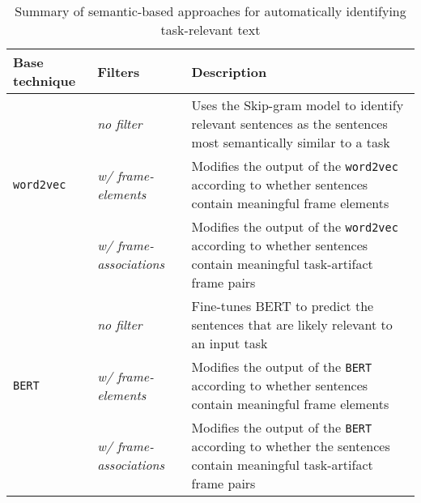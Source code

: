 
\begin{table}[H]
\caption{Summary of semantic-based approaches for automatically identifying task-relevant text}
\label{tbl:approaches-summary}
\centering    
\begin{scriptsize}
\begin{threeparttable}
\begin{tabular}{lll}




\textbf{Base technique} & \textbf{Filters} &  \textbf{Description} \\

\hline



& \textit{no filter} &
\parbox[l][1.0cm][c] {7cm}{
    Uses the Skip-gram model to identify relevant sentences as the sentences most semantically similar to a task 
}
\\

\texttt{word2vec} & \textit{w/ frame-elements} &
\parbox[l][1.0cm][c] {7cm}{
    Modifies the output of the \texttt{word2vec}  according to whether sentences contain meaningful frame elements
}
\\

    & \textit{w/ frame-associations} &
\parbox[l][1.0cm][c] {7cm}{
    Modifies the output of the \texttt{word2vec}  according to whether sentences contain meaningful task-artifact frame pairs
}
\\

\hline

    & \textit{no filter} &
\parbox[l][1.0cm][c] {7cm}{
    Fine-tunes BERT to predict the sentences that are likely relevant to an input task
}
\\

\texttt{BERT} & \textit{w/ frame-elements} &
\parbox[l][1.0cm][c] {7cm}{
    Modifies the output of the \texttt{BERT}  according to whether sentences contain meaningful frame elements
}
\\

    & \textit{w/ frame-associations} &
\parbox[l][1.0cm][c] {7cm}{
    Modifies the output of the \texttt{BERT}  according to whether the sentences contain meaningful task-artifact frame pairs
}
\\


\hline


\end{tabular}
\end{threeparttable}
\end{scriptsize}
\end{table}

